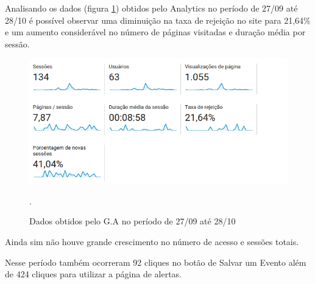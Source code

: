 \par Analisando os dados (figura \ref{fig:analytics_3ainteracao_dados}) obtidos pelo Analytics no período de 27/09 até 28/10 é possível observar uma diminuição na taxa de rejeição no site para 21,64\% e um aumento considerável no número de páginas visitadas e duração média por sessão.
\begin{figure}[htb]
\centering
\includegraphics[width=15cm]{figuras/analytics_3ainteracao_dados}
\caption{\label{fig:analytics_3ainteracao_dados} Dados obtidos pelo G.A no período de 27/09 até 28/10 }.
\end{figure}

\par Ainda sim não houve grande crescimento no número de acesso e sessões totais.

\par Nesse período também ocorreram 92 cliques no botão de Salvar um Evento além de 424 cliques para utilizar a página de alertas.
